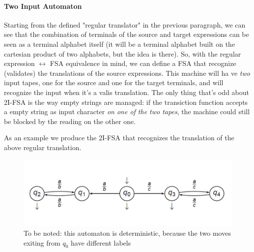 				\paragraph{Two Input Automaton}
					Starting from the defined "regular translator" in the previous paragraph, we can see that the combination of terminals of the source and 
					target expressions can be seen as a terminal alphabet itself (it will be a terminal alphabet built on the cartesian product of two alphabets, 
					but the idea is there). So, with the regular expression $\leftrightarrow$ FSA equivalence in mind, we can define a FSA that recognize (validates) 
					the translations of the source expressions. This machine will ha ve \emph{two} input tapes, one for the source and one for the target terminals, 
					and will recognize the input when it's a valis translation. The only thing that's odd about 2I-FSA is the way empty strings are managed: if the 
					transiction function accepts a empty string as input character \emph{on one of the two tapes}, the machine could still be blocked by the reading 
					on the other one.

					As an example we produce the 2I-FSA that recognizes the translation of the above regular translation.
					\begin{figure}[H]
						\centering
						\includegraphics[width = \textwidth]{./images/2IFSA.png}
						\caption{To be noted: this automaton is deterministic, because the two moves exiting from $q_0$ have different labels}
					\end{figure}
					
